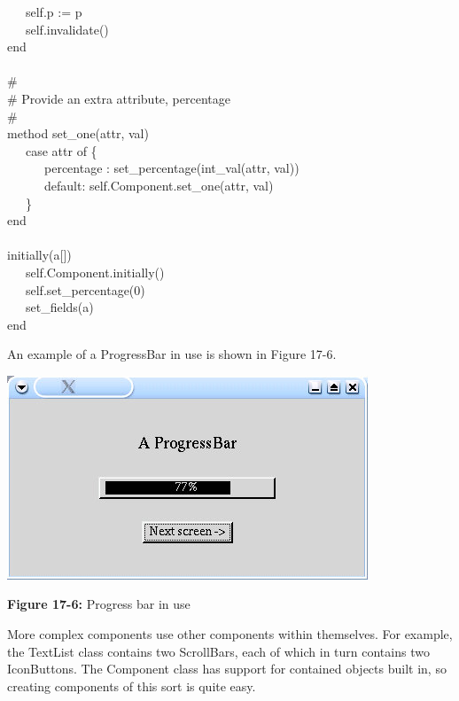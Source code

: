 {\>   \ \ \ self.p := p \\
\>   \ \ \ self.invalidate() \\
\>   end \\
\ \\
\>   \# \\
\>   \# Provide an extra attribute,
{\textquotedbl}percentage{\textquotedbl} \\
\>   \# \\
\>   method set\_one(attr, val) \\
\>   \ \ \ case attr of \{ \\
\>   \ \ \ \ \ \ {\textquotedbl}percentage{\textquotedbl} :
set\_percentage(int\_val(attr, val)) \\
\>   \ \ \ \ \ \ default: self.Component.set\_one(attr, val) \\
\>   \ \ \ \} \\
\>   end \\
\ \\
\>   initially(a[]) \\
\>   \ \ \ self.Component.initially() \\
\>   \ \ \ self.set\_percentage(0) \\
\>   \ \ \ set\_fields(a) \\
end \\
}

An example of a \textsf{ProgressBar} in use is shown in Figure 17-6.

\begin{center}
\includegraphics[width=4.2398in,height=2.3953in]{ub-img/ub-img55.jpg}
\end{center}

{\sffamily\bfseries Figure 17-6:}
{\sffamily Progress bar in use}

More complex components use other components within themselves. For
example, the \textsf{TextList} class contains two \textsf{ScrollBar}s,
each of which in turn contains two \textsf{IconButton}s. The
\textsf{Component} class has support for contained objects built in, so
creating components of this sort is quite easy.

